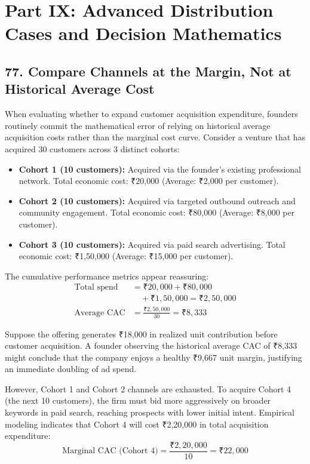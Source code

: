 \section*{Part IX: Advanced Distribution Cases and Decision Mathematics}

\subsection*{77. Compare Channels at the Margin, Not at Historical Average Cost}

When evaluating whether to expand customer acquisition expenditure, founders routinely commit the mathematical error of relying on historical average acquisition costs rather than the marginal cost curve. Consider a venture that has acquired 30 customers across 3 distinct cohorts:
\begin{itemize}[leftmargin=*,itemsep=1pt]
  \item \textbf{Cohort 1 (10 customers):} Acquired via the founder's existing professional network. Total economic cost: ₹20,000 (Average: ₹2,000 per customer).
  \item \textbf{Cohort 2 (10 customers):} Acquired via targeted outbound outreach and community engagement. Total economic cost: ₹80,000 (Average: ₹8,000 per customer).
  \item \textbf{Cohort 3 (10 customers):} Acquired via paid search advertising. Total economic cost: ₹1,50,000 (Average: ₹15,000 per customer).
\end{itemize}

The cumulative performance metrics appear reassuring:
\begin{align*}
  \text{Total spend} &= \text{₹}20,000 + \text{₹}80,000 \\
  &\quad + \text{₹}1,50,000 = \text{₹}2,50,000 \\
  \text{Average CAC} &= \frac{\text{₹}2,50,000}{30} = \text{₹}8,333
\end{align*}

Suppose the offering generates ₹18,000 in realized unit contribution before customer acquisition. A founder observing the historical average CAC of ₹8,333 might conclude that the company enjoys a healthy ₹9,667 unit margin, justifying an immediate doubling of ad spend.

However, Cohort 1 and Cohort 2 channels are exhausted. To acquire Cohort 4 (the next 10 customers), the firm must bid more aggressively on broader keywords in paid search, reaching prospects with lower initial intent. Empirical modeling indicates that Cohort 4 will cost ₹2,20,000 in total acquisition expenditure:
\begin{equation*}
  \text{Marginal CAC (Cohort 4)} = \frac{\text{₹}2,20,000}{10} = \text{₹}22,000
\end{equation*}

